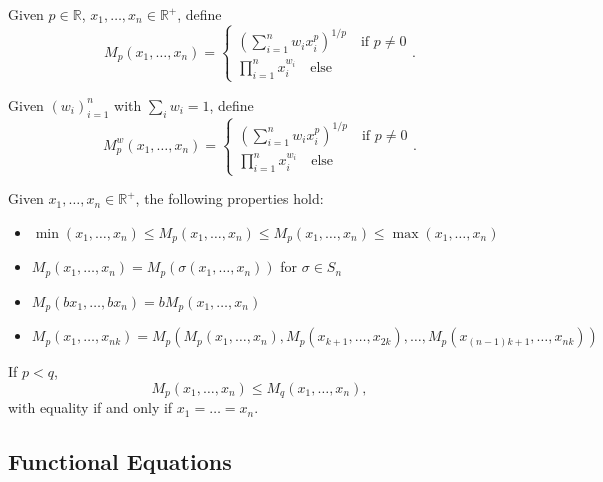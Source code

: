 \documentclass[11pt]{article}
\newcommand{\R}{\mathbb{R}}
\renewcommand{\>}{\rangle}
\newcommand{\<}{\langle}
\begin{document}
\begin{definition} Given $p \in \R$, $x_1, \dots, x_n \in \R^+$, define 
$$M_p(x_1, \dots, x_n) = \begin{cases}\left (\sum_{i=1}^n w_i x_i^p \right)^{1/p} \quad \text{if } p \ne 0 \\ \prod_{i=1}^n x_i^{w_i} \quad \text{else} \end{cases}.$$
\end{definition}
\begin{definition} Given $(w_i)_{i=1}^n$ with $\sum_i w_i = 1$, define 
$$M_p^w(x_1, \dots, x_n) = \begin{cases}\left (\sum_{i=1}^n w_i x_i^p \right)^{1/p} \quad \text{if } p \ne 0 \\ \prod_{i=1}^n x_i^{w_i} \quad \text{else} \end{cases}.$$
\end{definition}
\begin{theorem}
Given $x_1, \dots, x_n \in \R^+$, the following properties hold:
\begin{itemize}
\item $\min(x_1, \dots, x_n) \le M_p(x_1, \dots, x_n) \le M_p(x_1, \dots, x_n) \le \max(x_1, \dots, x_n)$ 
\item $M_p(x_1, \dots, x_n) = M_p(\sigma(x_1, \dots, x_n))$ for $\sigma \in S_n$ 
\item $M_p(bx_1, \dots, bx_n) = b M_p(x_1, \dots, x_n)$
\item $M_p(x_1,\dots, x_{nk}) = M_p(M_p(x_1, \dots, x_n), M_p(x_{k+1}, \dots, x_{2k}), \dots, M_p(x_{(n-1)k + 1}, \dots, x_{nk}))$
\end{itemize}
\end{theorem}
\begin{theorem}
If $p < q$,
$$M_p(x_1, \dots, x_n) \le M_q(x_1, \dots, x_n),$$
with equality if and only if $x_1 = \dots = x_n$.
\end{theorem}
\subsection{Functional Equations}
\end{document}
